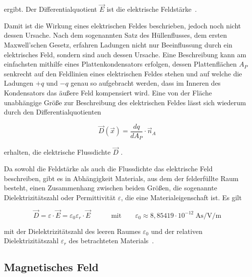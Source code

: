 ergibt. Der Differentialquotient $\vec E$ ist die elektrische Feldstärke~\cite{EM_Schirmung}. \par
\vspace{\linespace}
Damit ist die Wirkung eines elektrischen Feldes beschrieben, jedoch noch nicht dessen Ursache. Nach dem sogenannten Satz des Hüllenflusses, dem ersten Maxwell'schen Gesetz, erfahren Ladungen nicht nur Beeinflussung durch ein elektrisches Feld, sondern sind auch dessen Ursache. Eine Beschreibung kann am einfachsten mithilfe eines Plattenkondensators erfolgen, dessen Plattenflächen $A_P$ senkrecht auf den Feldlinien eines elektrischen Feldes stehen und auf welche die Ladungen $+q$ und $-q$ genau so aufgebracht werden, dass im Inneren des Kondensators das äußere Feld kompensiert wird. Eine von der Fläche unabhängige Größe zur Beschreibung des elektrischen Feldes lässt sich wiederum durch den Differentialquotienten 

\begin{equation}
    \vec D(\vec x) = \frac{dq}{dA_P} \cdot \vec n_A
\end{equation}

erhalten, die elektrische Flussdichte $\vec D$ \cite{EM_Schirmung}. \par
\vspace{\linespace}

Da sowohl die Feldstärke als auch die Flussdichte das elektrische Feld beschreiben, gibt es in Abhängigkeit Materials, aus dem der felderfüllte Raum besteht, einen Zusammenhang zwischen beiden Größen, die sogenannte Dielektrizitätszahl oder Permittivität $\varepsilon$, die eine Materialeigenschaft ist. Es gilt

\begin{equation}
    \vec D = \varepsilon \cdot \vec E = \varepsilon_0 \varepsilon_r \cdot \vec E \qquad \quad \text{mit} \qquad \varepsilon_0 \approx 8,85419 \cdot 10^{-12} \; \si{\ampere\second\per\volt\per\meter}
    \label{eq:2_Materialgleichung_elektrisches_Feld}
\end{equation}

mit der Dielektrizitätszahl des leeren Raumes $\varepsilon_0$ und der relativen Dielektrizitätszahl $\varepsilon_r$ des betrachteten Materials~\cite{EM_Schirmung}.


\subsection{Magnetisches Feld}\label{cha:2_sub_Magnetisches_Feld}


